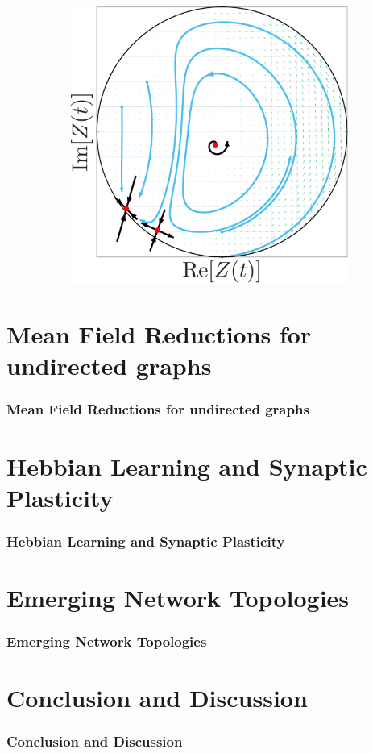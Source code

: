 \begin{frame}
\begin{figure}[H]
\begin{subfigure}[b]{0.32\linewidth}
   \label{fig:MFRPSS}
\end{subfigure} \hfill
\begin{subfigure}[b]{0.32\linewidth}
   \centering
  \includegraphics[width=\linewidth]{../Figures/PhaseSpace/MFRCPW.pdf}
   \label{fig:MFRCPW}
\end{subfigure}
   \label{fig:macroscopicstatesfixeddegree}
\end{figure}
\end{frame}

\section{\mywork Mean Field Reductions for undirected graphs} 
\begin{frame}
\frametitle{\mywork Mean Field Reductions for undirected graphs} 
\end{frame}


\section{Hebbian Learning and Synaptic Plasticity} 
\begin{frame}
\frametitle{Hebbian Learning and Synaptic Plasticity}
\end{frame}


\section{\mywork Emerging Network Topologies} 
\begin{frame}
\frametitle{\mywork Emerging Network Topologies}
\end{frame}


\section{Conclusion and Discussion} 
\begin{frame}
\frametitle{Conclusion and Discussion}
\end{frame}
